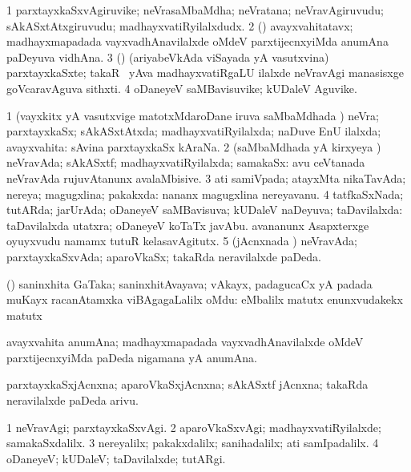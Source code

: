 \bentry
{}
\gl{\nA}
\bmng
\bnum
\num{1} parxtayxkaSxvAgiruvike; neVrasaMbaMdha; neVratana; neVravAgiruvudu; sAkASxtAtxgiruvudu; madhayxvatiRyilalxdudx. 
\num{2} (\takaR) avayxvahitatavx; madhayxmapadada vayxvadhAnavilalxde oMdeV parxtijecnxyiMda anumAna paDeyuva vidhAna. 
\num{3} (\tashA) (ariyabeVkAda viSayada yA vasutxvina) parxtayxkaSxte; takaR \mo\ yAva madhayxvatiRgaLU ilalxde neVravAgi manasisxge goVcaravAguva sithxti. 
\num{4} oDaneyeV saMBavisuvike; kUDaleV Aguvike. 
\enum
\emng
\eentry

\bentry
{}
\gl{\gu}
\bmng
\bnum
\num{1} (vayxkitx yA vasutxvige matotxMdaroDane iruva saMbaMdhada \vi) neVra; parxtayxkaSx; sAkASxtAtxda; madhayxvatiRyilalxda; naDuve EnU ilalxda; avayxvahita:  sAvina parxtayxkaSx kAraNa. 
\num{2} (saMbaMdhada yA kirxyeya \vi) neVravAda; sAkASxtf; madhayxvatiRyilalxda; samakaSx:  avu ceVtanada neVravAda rujuvAtanunx avalaMbisive. 
\num{3} ati samiVpada; atayxMta nikaTavAda; nereya; magugxlina; pakakxda:  nananx magugxlina nereyavanu. 
\num{4} tatfkaSxNada; tutARda; jarUrAda; oDaneyeV saMBavisuva; kUDaleV naDeyuva; taDavilalxda:  taDavilalxda utatxra; oDaneyeV koTaTx javAbu.  avananunx Asapxterxge oyuyxvudu namamx tutuR kelasavAgitutx. 
\num{5} (jAcnxnada \vi) neVravAda; parxtayxkaSxvAda; aparoVkaSx; takaRda neravilalxde paDeda. 
\enum
\emng
\eentry

\bentry
{}
\gl{\nA}
\bmng
(\BAshA) saninxhita GaTaka; saninxhitAvayava; vAkayx, padagucaCx yA padada muKayx racanAtamxka viBAgagaLalilx oMdu:  eMbalilx  matutx  enunxvudakekx  matutx  
\emng
\eentry

\bentry
{}
\gl{\nA}
\bmng
avayxvahita anumAna; madhayxmapadada vayxvadhAnavilalxde oMdeV parxtijecnxyiMda paDeda nigamana yA anumAna. 
\emng
\eentry

\bentry
{}
\gl{\nA}
\bmng
parxtayxkaSxjAcnxna; aparoVkaSxjAcnxna; sAkASxtf jAcnxna; takaRda neravilalxde paDeda arivu. 
\emng
\eentry

\bentry
{}
\gl{\kirxvi}
\bmng
\bnum
\num{1} neVravAgi; parxtayxkaSxvAgi. 
\num{2} aparoVkaSxvAgi; madhayxvatiRyilalxde; samakaSxdalilx. 
\num{3} nereyalilx; pakakxdalilx; sanihadalilx; ati samIpadalilx. 
\num{4} oDaneyeV; kUDaleV; taDavilalxde; tutARgi. 
\enum
\emng
\eentry

